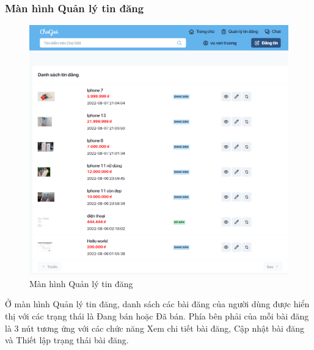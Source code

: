 \documentclass[../DoAn.tex]{subfiles}
\begin{document}
\subsubsection{Màn hình Quản lý tin đăng}
\begin{figure}[H]
    \centering
    \includegraphics[width=0.9\linewidth]{Hinhve/3-manage.png}
    \caption{Màn hình Quản lý tin đăng}
    \label{fig:Fig1}
\end{figure}
Ở màn hình Quản lý tin đăng, danh sách các bài đăng của người dùng được hiển thị với các trạng thái là Đang bán hoặc Đã bán. Phía bên phải của mỗi bài đăng là 3 nút tương ứng với các chức năng Xem chi tiết bài đăng, Cập nhật bài đăng và Thiết lập trạng thái bài đăng.
\newpage
\end{document}
